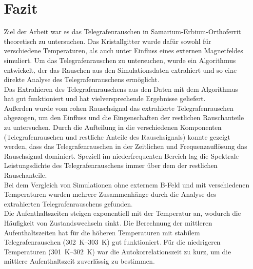 \documentclass[main.tex]{subfiles}
\begin{document}
\newpage
\section{Fazit}

Ziel der Arbeit war es das Telegrafenrauschen in Samarium-Erbium-Orthoferrit theoretisch zu untersuchen. Das Kristallgitter wurde dafür sowohl für verschiedene Temperaturen, als auch unter Einfluss eines externen Magnetfeldes simuliert. 
Um das Telegrafenrauschen zu untersuchen, wurde ein Algorithmus entwickelt, der das Rauschen aus den Simulationsdaten extrahiert und so eine direkte Analyse des Telegrafenrauschens ermöglicht.\\

Das Extrahieren des Telegrafenrauschens aus den Daten mit dem Algorithmus hat gut funktioniert und hat vielversprechende Ergebnisse geliefert.\\
Außerden wurde vom rohen Rauschsignal das extrahierte Telegrafenrauschen abgezogen, um den Einfluss und die Eingenschaften der restlichen Rauschanteile zu untersuchen.
Durch die Aufteilung in die verschiedenen Komponenten (Telegrafenrauschen und restliche Anteile des Rauschsignals) konnte gezeigt werden, dass das Telegrafenrauschen in der Zeitlichen und Frequenzauflösung das Rauschsignal dominiert. Speziell im niederfrequenten Bereich lag die Spektrale Leistungsdichte des Telegrafenrauschens immer über dem der restlichen Rauschanteile.\\

Bei dem Vergleich von Simulationen ohne externem B-Feld und mit verschiedenen Temperaturen wurden mehrere Zusammenhänge durch die Analyse des extrahierten Telegrafenrauschens gefunden.\\
Die Aufenthaltszeiten steigen exponentiell mit der Temperatur an, wodurch die Häufigkeit von Zustandswechseln sinkt. Die Berechnung der mittleren Aufenthaltszeiten hat für die höheren Temperaturen mit stabilem Telegrafenrauschen (\SIrange{302}{303}{\kelvin}) gut funktioniert. Für die niedrigeren Temperaturen (\SIrange{301}{302}{\kelvin}) war die Autokorrelationszeit zu kurz, um die mittlere Aufenthaltszeit zuverlässig zu bestimmen.\\
\end{document}
